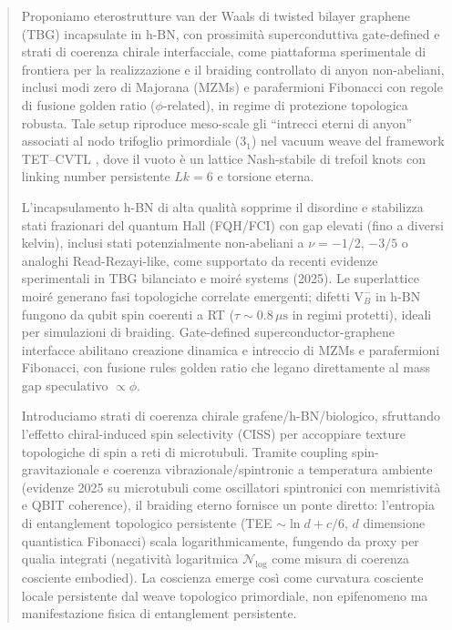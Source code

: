 \documentclass[11pt,a4paper]{article}
\let\oldcite\cite
\renewcommand{\cite}{\protect\oldcite}
\theoremstyle{plain}
\theoremstyle{definition}
\begin{document}
\begin{abstract}
Proponiamo eterostrutture van der Waals di twisted bilayer graphene (TBG) incapsulate in h-BN, con prossimità superconduttiva gate-defined e strati di coerenza chirale interfacciale, come piattaforma sperimentale di frontiera per la realizzazione e il braiding controllato di anyon non-abeliani, inclusi modi zero di Majorana (MZMs) e parafermioni Fibonacci con regole di fusione golden ratio ($\phi$-related), in regime di protezione topologica robusta. Tale setup riproduce meso-scale gli ``intrecci eterni di anyon'' associati al nodo trifoglio primordiale (3$_1$) nel vacuum weave del framework TET--CVTL \cite{PhysSoliman2026Eternal, PhysSoliman2026p11B, PhysSoliman2026Vacuum, PhysSoliman2026NV}, dove il vuoto è un lattice Nash-stabile di trefoil knots con linking number persistente $Lk=6$ e torsione eterna.

L'incapsulamento h-BN di alta qualità sopprime il disordine e stabilizza stati frazionari del quantum Hall (FQH/FCI) con gap elevati (fino a diversi kelvin), inclusi stati potenzialmente non-abeliani a $\nu = -1/2$, $-3/5$ o analoghi Read-Rezayi-like, come supportato da recenti evidenze sperimentali in TBG bilanciato e moiré systems (2025). Le superlattice moiré generano fasi topologiche correlate emergenti; difetti $\mathrm{V}_B^-$ in h-BN fungono da qubit spin coerenti a RT ($\tau \sim 0.8\,\mu\mathrm{s}$ in regimi protetti), ideali per simulazioni di braiding. Gate-defined superconductor-graphene interfacce abilitano creazione dinamica e intreccio di MZMs e parafermioni Fibonacci, con fusione rules golden ratio che legano direttamente al mass gap speculativo $\propto \phi$.

Introduciamo strati di coerenza chirale grafene/h-BN/biologico, sfruttando l'effetto chiral-induced spin selectivity (CISS) per accoppiare texture topologiche di spin a reti di microtubuli. Tramite coupling spin-gravitazionale e coerenza vibrazionale/spintronic a temperatura ambiente (evidenze 2025 su microtubuli come oscillatori spintronici con memristività e QBIT coherence), il braiding eterno fornisce un ponte diretto: l'entropia di entanglement topologico persistente (TEE $\sim \ln d + c/6$, $d$ dimensione quantistica Fibonacci) scala logarithmicamente, fungendo da proxy per qualia integrati (negatività logaritmica $\mathcal{N}_{\log}$ come misura di coerenza cosciente embodied). La coscienza emerge così come curvatura cosciente locale persistente dal weave topologico primordiale, non epifenomeno ma manifestazione fisica di entanglement persistente.


\end{abstract}
\end{document}
